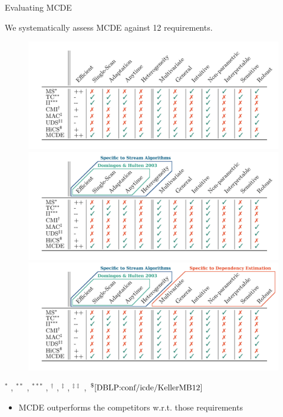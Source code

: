 \documentclass[16pt,usenames,dvipsnames, notheorems]{beamer}
\theoremstyle{definition}
\theoremstyle{example}
\theoremstyle{plain}
\begin{document}
\begin{frame}{Evaluating MCDE}

We systematically assess MCDE against 12 requirements.  
\vspace{-0.25cm}
\begin{figure}
	\begin{overprint}
		 \includegraphics[trim=0.5cm 0 0.5cm 0, width=1.0\linewidth]{figures/table_requirements_1-small.jpg}
		\onslide<2> \includegraphics[trim=0.5cm 0 0.5cm 0, width=1.0\linewidth]{figures/table_requirements_3-small.jpg}
		\onslide<3-> \includegraphics[trim=0.5cm 0 0.5cm 0, width=1.0\linewidth]{figures/table_requirements_4-small.jpg}
	\end{overprint}
\end{figure}
\vspace{-0.75cm}
{\footnotesize $^*$ \cite{SCHMID2007407}, $^{**}$ \cite{DBLP:journals/ibmrd/Watanabe60}, $^{***}$ \cite{DBLP:journals/tit/McGill54}, $^{\dagger}$ \cite{DBLP:conf/sdm/BohmKMNV13}, $^{\ddagger}$  \cite{DBLP:conf/icml/NguyenMVEB14}, $^{\ddagger\ddagger}$ \cite{DBLP:conf/sdm/NguyenMV16}, $^\$ \cite{DBLP:conf/icde/KellerMB12}$}
\pause
\pause
\begin{itemize}
	\item MCDE outperforms the competitors w.r.t. those requirements
\end{itemize}
\end{frame}
\end{document}
